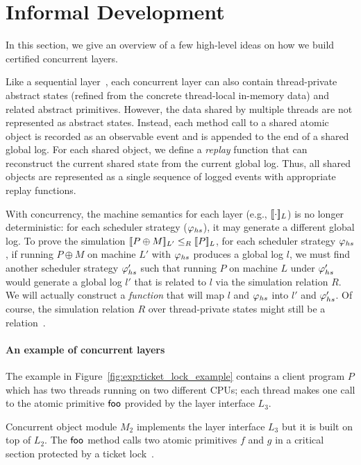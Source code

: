 \section{Informal Development}
\label{sec:informal}

In this section, we give an overview of a few high-level ideas on how
we build certified concurrent layers. 

Like a sequential layer~\cite{dscal15}, each concurrent layer can also
contain thread-private abstract states (refined from the concrete
thread-local in-memory data) and related abstract primitives. However,
the data shared by multiple threads are not represented as abstract
states. Instead, each method call to a shared atomic object is
recorded as an observable event and is appended to the end of a shared
global log. For each shared object, we define a {\em replay} function
that can reconstruct the current shared state from the current global
log. Thus, all shared objects are represented as a single sequence of
logged events with appropriate replay functions.

With concurrency, the machine semantics for each layer (e.g.,
$\sem{L}{\cdot}$) is no longer deterministic: for each scheduler
strategy ($\strat{hs}$), it may generate a different global
log. To prove the simulation $\sem{L'}{P\oplus{}M} \leq_R \sem{L}{P}$,
for each scheduler strategy $\strat{hs}$, if running $P\oplus{}M$ on
machine $L'$ with $\strat{hs}$ produces a global log $l$, we must find
another scheduler strategy $\stratp{hs}$ such that running $P$ on
machine $L$ under $\stratp{hs}$ would generate a global log $l'$ that
is related to $l$ via the simulation relation $R$. We will actually
construct a {\em function} that will map $l$ and $\strat{hs}$ into
$l'$ and $\stratp{hs}$. Of course, the simulation relation $R$ over
thread-private states might still be a relation~\cite{dscal15}.

\paragraph{An example of concurrent layers}
The example in Figure~\ref{fig:exp:ticket_lock_example} contains a
client program $P$ which has two threads running on two different
CPUs; each thread makes one call to the atomic primitive $\comm{foo}$
provided by the layer interface $L_3$.

Concurrent object module $M_2$ implements the layer interface $L_3$
but it is built on top of $L_2$.  The $\comm{foo}$ method calls two
atomic primitives $f$ and $g$ in a critical section protected by a
ticket lock~\cite{mcs91}.

